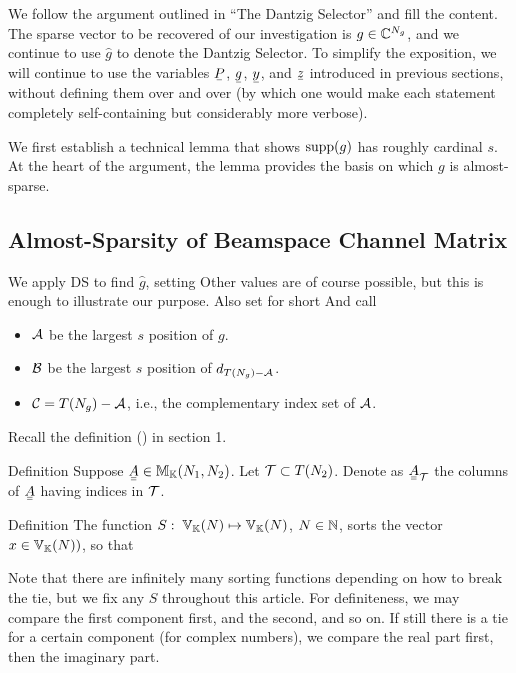 
We follow the argument outlined in ``The Dantzig Selector'' and fill the content.
The sparse vector to be recovered of our investigation is \(g \in \mathbb{C}^{N_g}\), and we continue to use \(\hat{g}\) to denote the Dantzig Selector.
To simplify the exposition, we will continue to use the variables \(\V{P}\), \(\V{g}\), \(\V{y}\), and \(\V{z}\) introduced in previous sections, without defining them over and over (by which one would make each statement completely self-containing but considerably more verbose).

We first establish a technical lemma that shows \(\mathrm{supp}(g)\) has roughly cardinal \(s\).
At the heart of the argument, the lemma provides the basis on which \(g\) is almost-sparse.

\subsection{Almost-Sparsity of Beamspace Channel Matrix}

We apply DS to find \(\hat{g}\), setting
Other values are of course possible, but this is enough to illustrate our purpose.
Also set for short
%
%
And call
\begin{itemize}
\item \(\mathcal{A}\) be the largest \(s\) position of \(g\).
\item \(\mathcal{B}\) be the largest \(s\) position of \(d_{T(N_g) -\mathcal{A}}\).
\item \(\mathcal{C} =T(N_g) -\mathcal{A}\), i.e., the complementary index set of \(\mathcal{A}\).
\end{itemize}

Recall the definition () in section 1.

\Result
{Definition}
{
Suppose \(\M{A} \in \MB{M}_{\MB{K}} (N_1, N_2)\).
Let \(\mathcal{T} \subset T (N_2)\).
Denote as \(\M{A}_{\MC{T}}\) the columns of \(\M{A}\) having indices in \(\mathcal{T}\).
}

\Result
{Definition}
{
The function \(S:\; \mathbb{V}_{\mathbb{K}}(N) \mapsto \mathbb{V}_{\mathbb{K}}(N)\), \(N \in \mathbb{N}\), sorts the vector \(x \in \mathbb{V}_{\mathbb{K}}(N))\), so that
}

Note that there are infinitely many sorting functions depending on how to break the tie, but we fix any \(S\) throughout this article.
For definiteness, we may compare the first component first, and the second, and so on.
If still there is a tie for a certain component (for complex numbers), we compare the real part first, then the imaginary part.


